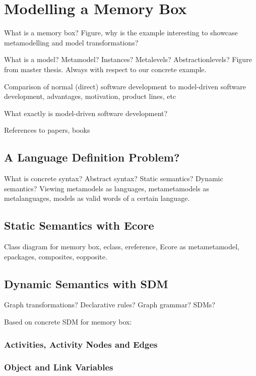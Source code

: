 \chapter{Modelling a Memory Box}
\label{chap:membox}

What is a memory box?  Figure, why is the example interesting to showcase
metamodelling and model transformations?

What is a model? Metamodel? Instances? Metalevels? Abstractionlevels? Figure
from master thesis.  Always with respect to our concrete example.

Comparison of normal (direct) software development to model-driven software
development, advantages, motivation, product lines, etc

What exactly is model-driven software development?

References to papers, books

\section{A Language Definition Problem?}

What is concrete syntax?  Abstract syntax?  Static semantics?  Dynamic
semantics?  Viewing metamodels as languages, metametamodels as metalanguages,
models as valid words of a certain language.

\section{Static Semantics with Ecore}

Class diagram for memory box, eclass, ereference, Ecore as metametamodel,
epackages, composites, eopposite.

\section{Dynamic Semantics with SDM}

Graph transformations?  Declarative rules?  Graph grammar?  SDMs?

Based on concrete SDM for memory box:

\subsection*{Activities, Activity Nodes and Edges}

\subsection*{Object and Link Variables}

